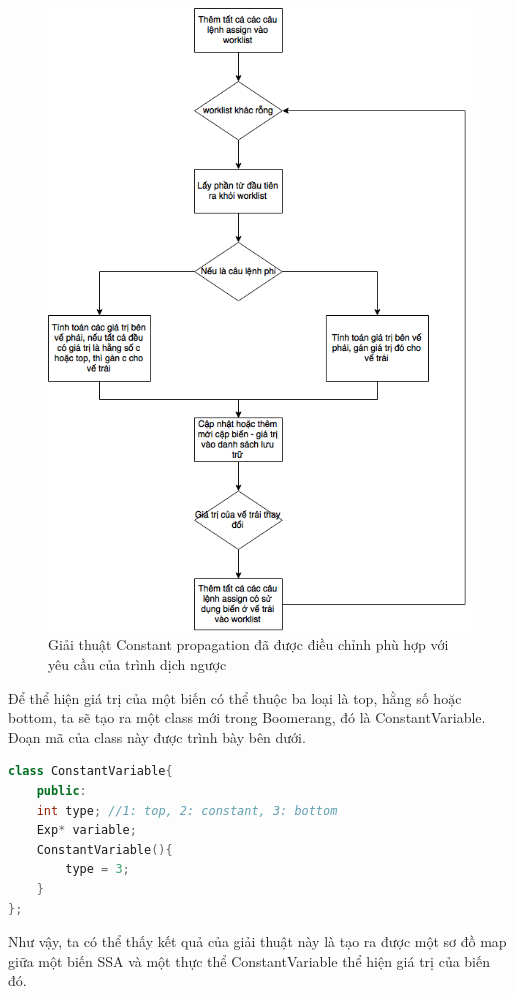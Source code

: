 \begin{figure}
	\centering
	\includegraphics[scale=0.75]{image/constantPropagationAlgo}
	\caption{Giải thuật Constant propagation đã được điều chỉnh phù hợp với yêu cầu của trình dịch ngược}
	\label{fig:constantpropagationalgo}
\end{figure}

Để thể hiện giá trị của một biến có thể thuộc ba loại là top, hằng số hoặc bottom, ta sẽ tạo ra một class mới trong Boomerang, đó là ConstantVariable. Đoạn mã của class này được trình bày bên dưới.
\begin{lstlisting}[caption={Đoạn mã thể hiện class ConstantVariable},label={list:listconstexam5}, language=c++]
class ConstantVariable{
	public:
	int type; //1: top, 2: constant, 3: bottom
	Exp* variable;
	ConstantVariable(){
		type = 3;
	}
};
\end{lstlisting}
Như vậy, ta có thể thấy kết quả của giải thuật này là tạo ra được một sơ đồ map giữa một biến SSA và một thực thể ConstantVariable thể hiện giá trị của biến đó. \\

